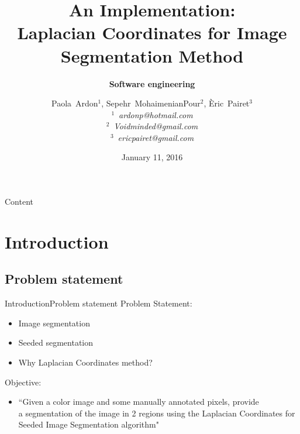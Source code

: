 \documentclass[10pt]{beamer}
\title[LCIS]{An Implementation:\\ Laplacian Coordinates for Image Segmentation Method}
\subtitle[]{\textbf{Software engineering}}
\author[Paola~Ardon, Sepehr~MohaimenianPour, \`Eric~Pairet]{Paola~Ardon$^1$, Sepehr~MohaimenianPour$^2$, \`Eric~Pairet$^3$
		\vspace{0.2cm} \\
        $^1\,$ \textit{ardonp@hotmail.com} \\
        $^2\,$ \textit{Voidminded@gmail.com} \\
        $^3\,$ \textit{ericpairet@gmail.com}}
\date{January 11, 2016}
\begin{document}
{\1
 \begin{frame} 
  \titlepage
\end{frame}} 

\begin{frame}{Content}{}
\begin{multicols}{2}
  \tableofcontents
\end{multicols}
\end{frame} 
 
\section{Introduction}
\subsection{Problem statement}
\begin{frame}{Introduction}{Problem statement}
	Problem Statement:
      \begin{itemize}
        \item Image segmentation
        \item Seeded segmentation
         \item Why Laplacian Coordinates method?
         \end{itemize}
	
   \vspace{0.5cm}
   Objective:
       \begin{itemize}
         \item ``Given a color image and some manually annotated pixels, provide \\a segmentation of the image in 2 regions using the Laplacian Coordinates for Seeded Image Segmentation algorithm"
        \end{itemize}
    
\end{frame}
\end{document}
